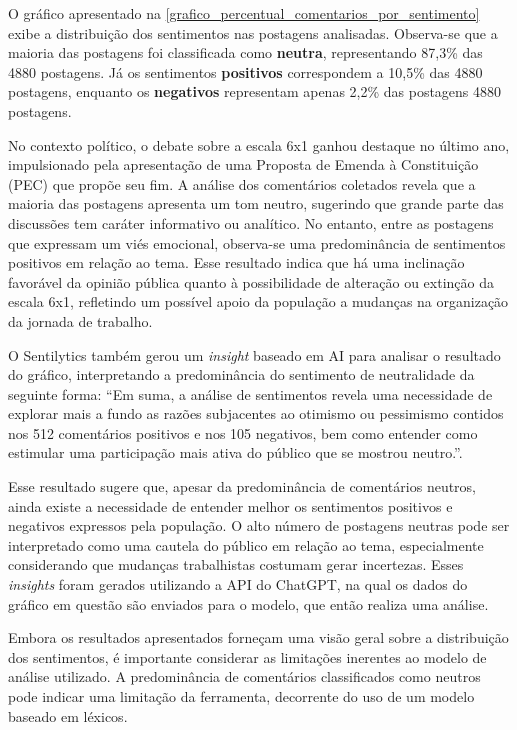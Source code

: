 \documentclass[
	12pt,				%
	oneside,			%
	a4paper,			%
	english,			%
	french,				%
	spanish,			%
	brazil				%
	]{abntex2}
\begin{document}
O gráfico apresentado na
\autoref{grafico_percentual_comentarios_por_sentimento} exibe a
distribuição dos sentimentos nas postagens analisadas. Observa-se que a
maioria das postagens foi classificada como \textbf{neutra},
representando 87,3\% das 4880 postagens. Já os sentimentos
\textbf{positivos} correspondem a 10,5\% das 4880 postagens, enquanto os
\textbf{negativos} representam apenas 2,2\% das postagens 4880
postagens.

No contexto político, o debate sobre a escala 6x1 ganhou destaque no
último ano, impulsionado pela apresentação de uma Proposta de Emenda à
Constituição (PEC) que propõe seu fim. A análise dos comentários
coletados revela que a maioria das postagens apresenta um tom neutro,
sugerindo que grande parte das discussões tem caráter informativo ou
analítico. No entanto, entre as postagens que expressam um viés
emocional, observa-se uma predominância de sentimentos positivos em
relação ao tema. Esse resultado indica que há uma inclinação favorável
da opinião pública quanto à possibilidade de alteração ou extinção da
escala 6x1, refletindo um possível apoio da população a mudanças na
organização da jornada de trabalho.

O Sentilytics também gerou um \emph{insight} baseado em AI para analisar
o resultado do gráfico, interpretando a predominância do sentimento de
neutralidade da seguinte forma: ``Em suma, a análise de sentimentos
revela uma necessidade de explorar mais a fundo as razões subjacentes ao
otimismo ou pessimismo contidos nos 512 comentários positivos e nos 105
negativos, bem como entender como estimular uma participação mais ativa
do público que se mostrou neutro.''.

Esse resultado sugere que, apesar da predominância de comentários
neutros, ainda existe a necessidade de entender melhor os sentimentos
positivos e negativos expressos pela população. O alto número de
postagens neutras pode ser interpretado como uma cautela do público em
relação ao tema, especialmente considerando que mudanças trabalhistas
costumam gerar incertezas. Esses \emph{insights} foram gerados
utilizando a API do ChatGPT, na qual os dados do gráfico em questão são
enviados para o modelo, que então realiza uma análise.

Embora os resultados apresentados forneçam uma visão geral sobre a
distribuição dos sentimentos, é importante considerar as limitações
inerentes ao modelo de análise utilizado. A predominância de comentários
classificados como neutros pode indicar uma limitação da ferramenta,
decorrente do uso de um modelo baseado em léxicos.
\end{document}
